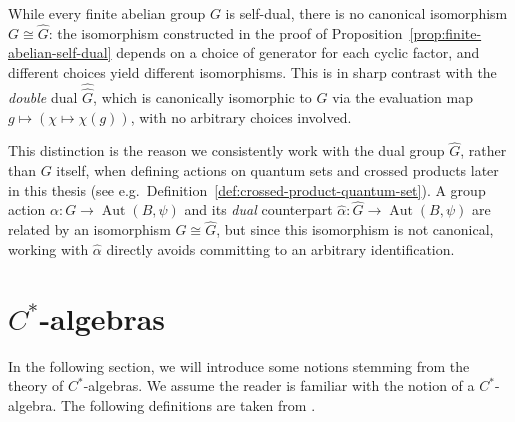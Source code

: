 \begin{remark}
    \label{rem:no-canonical-isomorphism}
    While every finite abelian group \( G \) is self-dual, there is no
    canonical isomorphism \( G \cong \widehat{G} \): the isomorphism
    constructed in the proof of
    Proposition~\ref{prop:finite-abelian-self-dual} depends on a choice
    of generator for each cyclic factor, and different choices yield
    different isomorphisms. This is in sharp contrast with the
    \emph{double} dual \( \hat{\hat{G}} \), which is canonically
    isomorphic to \( G \) via the evaluation map \( g \mapsto (\chi
    \mapsto \chi(g)) \), with no arbitrary choices involved.

    This distinction is the reason we consistently work with the dual
    group \( \widehat{G} \), rather than \( G \) itself, when defining
    actions on quantum sets and crossed products later in this thesis
    (see e.g.\ Definition~\ref{def:crossed-product-quantum-set}). A
    group action \( \alpha \colon G \to \operatorname{Aut}(B,\psi) \)
    and its \emph{dual} counterpart
    \( \widehat\alpha \colon \widehat{G} \to \operatorname{Aut}(B,\psi) \) are
    related by an isomorphism \( G \cong \widehat{G} \), but since this
    isomorphism is not canonical, working with \( \widehat\alpha \)
    directly avoids committing to an arbitrary identification.
\end{remark}

\section{\(C^{*}\)-algebras}
\label{sec:cstar-algebras}

In the following section, we will introduce some notions stemming from the
theory of \( C^{*} \)-algebras. We assume the reader is familiar with
the notion of a \(C^{*}\)-algebra. The following definitions are
taken from \textcite{blackadar}.

